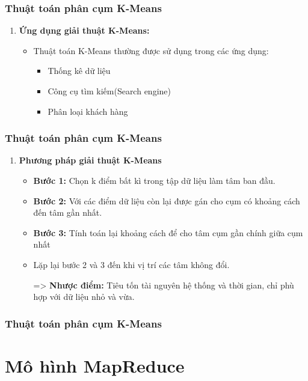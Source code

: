 \documentclass[12pt]{beamer}
\begin{document}
	\begin{frame}
		\frametitle{Thuật toán phân cụm K-Means}
		\begin{enumerate} [\textbf{2.}]
			\item \textbf{Ứng dụng giải thuật K-Means:}
			\begin{itemize}
				\item Thuật toán K-Means thường được sử dụng trong các ứng dụng:
				\begin{itemize}
					\item Thống kê dữ liệu
					\item Công cụ tìm kiếm(Search engine)
					\item Phân loại khách hàng
				\end{itemize}
			\end{itemize}
		\end{enumerate}
	\end{frame}
	
	\begin{frame}
		\frametitle{Thuật toán phân cụm K-Means}
		\begin{enumerate} [\textbf{3.}]
			\item \textbf{Phương pháp giải thuật K-Means}
				\begin{itemize}
					\item \textbf{Bước 1:} Chọn k điểm bất kì trong tập dữ liệu làm tâm ban đầu.
					\item \textbf{Bước 2:} Với các điểm dữ liệu còn lại được gán cho cụm có khoảng cách đến tâm gần nhất.
					\item \textbf{Bước 3:} Tính toán lại khoảng cách để cho tâm cụm gần chính giữa cụm nhất
					\item Lặp lại bước 2 và 3 đến khi vị trí các tâm không đổi.
					\item[=>] \textbf{Nhược điểm:} Tiêu tốn tài nguyên hệ thống và thời gian, chỉ phù hợp với dữ liệu nhỏ và vừa.
				\end{itemize}
		\end{enumerate}
	\end{frame}

	\begin{frame}
		\frametitle{Thuật toán phân cụm K-Means}
		\animategraphics[controls, width=6cm]{1}{kmeans/kmeans-}{0}{13}
	\end{frame}
	
	\section{Mô hình MapReduce}
\end{document}
